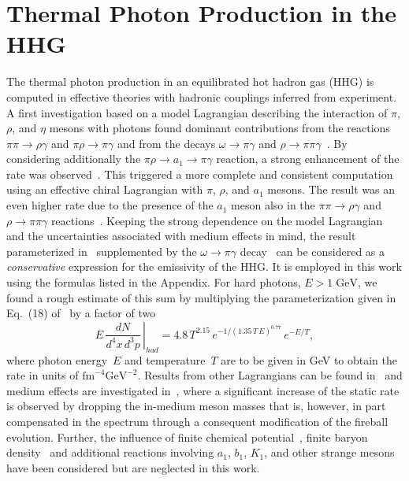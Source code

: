 \documentclass[12pt,twoside,fleqn]{article}
\newcommand{\be}{\begin{equation}}
\newcommand{\ee}{\end{equation}}
\newcommand{\fm}{\mbox{fm}}
\newcommand{\GeV}{\mbox{GeV}}
\begin{document}
\section{Thermal Photon Production in the HHG}
\label{Thermal_Photon_Production_HHG}
%
The thermal photon production in an equilibrated hot hadron gas (HHG) is
computed in effective theories with hadronic couplings inferred from experiment.
A first investigation based on a model Lagrangian describing the interaction of
$\pi$, $\rho$, and $\eta$ mesons with photons found dominant contributions from
the reactions $\pi \pi \rightarrow \rho \gamma$ and $\pi \rho \rightarrow \pi
\gamma$ and from the decays $\omega \rightarrow \pi \gamma$ and $\rho
\rightarrow \pi \pi \gamma$~\cite{KAPUSTA_1991,NADEAU_1992}.  By considering
additionally the $\pi \rho \rightarrow a_1 \rightarrow \pi \gamma$ reaction, a
strong enhancement of the rate was observed~\cite{XIONG_1992}. This triggered a
more complete and consistent computation using an effective chiral Lagrangian
with $\pi$, $\rho$, and $a_1$ mesons. The result was an even higher rate due to
the presence of the $a_1$ meson also in the $\pi \pi \rightarrow \rho \gamma$
and $\rho \rightarrow \pi \pi \gamma$ reactions~\cite{SONG_1993,SONG_1998}.
Keeping the strong dependence on the model Lagrangian and the uncertainties
associated with medium effects in mind, the result parameterized
in~\cite{SONG_1998} supplemented by the $\omega \rightarrow \pi \gamma$
decay~\cite{KAPUSTA_1991} can be considered as a {\em conservative} expression
for the emissivity of the HHG. It is employed in this work using the formulas
listed in the Appendix. For hard photons, $E > 1\;\GeV$, we found a rough
estimate of this sum by multiplying the parameterization given in Eq.~(18)
of~\cite{XIONG_1992} by a factor of two
%
\be
        \left. E\,\frac{dN}{d^4x\,d^3p} \,\right|_{had} = 
        4.8\,T^{2.15}\,e^{-1/(1.35\,T\,E)^{0.77}}\,e^{-E/T},
\label{Markus_suggestion}
\ee
%
where photon energy~$E$ and temperature~$T$ are to be given in GeV to obtain the
rate in units of $\fm^{-4}\GeV^{-2}$. Results from other Lagrangians can be
found in~\cite{KIM_1996,HALASZ_1998} and medium effects are investigated
in~\cite{SONG_1998,HALASZ_1998,STEELE_1996,SARKAR_1998}, where a significant
increase of the static rate is observed by dropping the in-medium meson masses
that is, however, in part compensated in the spectrum through a consequent
modification of the fireball evolution. Further, the influence of finite
chemical potential~\cite{STEELE_1996}, finite baryon density~\cite{STEELE_1997}
and additional reactions involving $a_1$, $b_1$, $K_1$, and other strange
mesons~\cite{HAGLIN_1994,LEE_1998} have been considered but are neglected in
this work.
%
\end{document}
